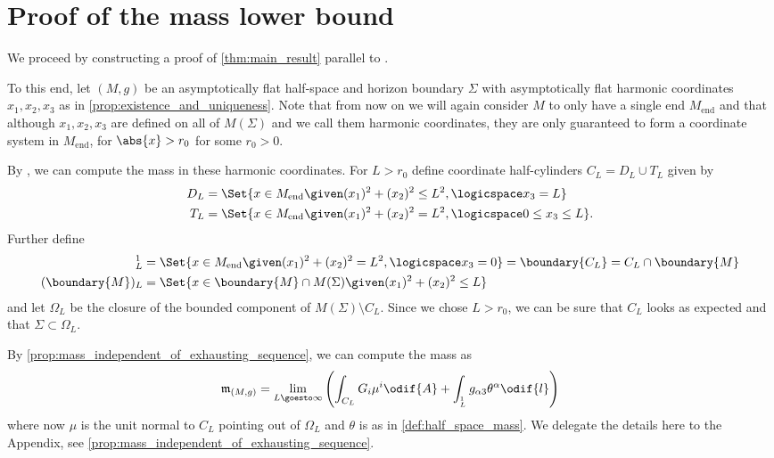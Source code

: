 \documentclass[titlepage,numbers=noenddot,oneside,%
cleardoublepage=empty,paper=a4,fontsize=11pt,%
english,%
]{scrartcl}
\let\sphere\relax
\newcommand{\sphere}{\mathbb{S}}
\newcommand{\Mend}{M_{\mathrm{end}}} %
\newcommand{\mass}[2]{\mathfrak{m}_{(#1,#2)}} %
\begin{document}
\section{Proof of the mass lower bound}\label{sec:proof_of_lower_bound}
We proceed by constructing a proof of \cref{thm:main_result} parallel to \cite[Section 6]{brayHarmonicFunctionsMass2019}.%

To this end, let \( (M,g) \) be an asymptotically flat half-space and horizon boundary \( \Sigma \) with asymptotically flat harmonic coordinates \( x_1,x_2,x_3 \) as in \cref{prop:existence_and_uniqueness}. Note that from now on we will again consider \( M \) to only have a single end \( \Mend \) and that although \( x_1,x_2,x_3 \) are defined on all of \( M(\Sigma) \) and we call them harmonic coordinates, they are only guaranteed to form a coordinate system in \( \Mend \), \ie for \( \abs{x}>r_0 \) for some \( r_0>0 \).

By \cite[Proposition 3.7]{almarazPositiveMassTheorem2016}, we can compute the mass in these harmonic coordinates. For \( L>r_0 \) define coordinate half-cylinders \( C_L=D_L\cup T_L \) given by
\begin{align*}
    D_L&=\Set{x\in \Mend\given (x_1)^2+(x_2)^2\leq L^2,\logicspace x_3=L}\\
    T_L&=\Set{x\in \Mend\given (x_1)^2+(x_2)^2=L^2,\logicspace 0\leq x_3\leq L}.
\end{align*}
Further define
\begin{align*}
    \sphere_L^1&=\Set{x\in \Mend \given (x_1)^2+(x_2)^2=L^2,\logicspace x_3=0}=\boundary{C_L}=C_L\cap \boundary{M}\\
    (\boundary{M})_L&=\Set{x\in \boundary{M}\cap M(\Sigma)\given (x_1)^2+(x_2)^2\leq L}
\end{align*}
and let \( \Omega_L \) be the closure of the bounded component of \( M(\Sigma)\setminus C_L \). Since we chose \( L>r_0 \), we can be sure that \( C_L  \) looks as expected and that \( \Sigma\subset \Omega_L \).

By \cref{prop:mass_independent_of_exhausting_sequence}, we can compute the mass as
\begin{equation*}
    \mass{M}{g}=\lim_{L \goesto \infty}\left( \int_{C_L}G_i  \mu^i\odif{A}+\int_{\sphere^1_L}g_{\alpha 3}\theta^\alpha\odif{l} \right)
\end{equation*}
where now \( \mu \) is the unit normal to \( C_L \) pointing out of \( \Omega_L \) and \( \theta \) is as in \cref{def:half_space_mass}. We delegate the details here to the Appendix, see \cref{prop:mass_independent_of_exhausting_sequence}.
\end{document}
